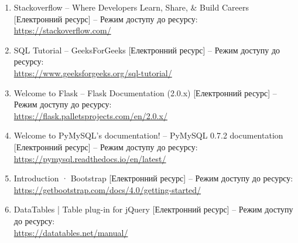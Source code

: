 \newpage

\bibsection
\begin{enumerate}
    \item Stackoverflow -- Where Developers Learn, Share, \& Build Careers [Електронний ресурс] --
    Режим доступу до ресурсу:\\ {\small \url{https://stackoverflow.com/}}
    \item SQL Tutorial -- GeeksForGeeks [Електронний ресурс] --
    Режим доступу до ресурсу:\\ {\small \url{https://www.geeksforgeeks.org/sql-tutorial/}}
    \item Welcome to Flask -- Flask Documentation (2.0.x) [Електронний ресурс] --
    Режим доступу до ресурсу:\\ {\small \url{https://flask.palletsprojects.com/en/2.0.x/}}
    \item Welcome to PyMySQL’s documentation! -- PyMySQL 0.7.2 documentation [Електронний ресурс] --
    Режим доступу до ресурсу:\\ {\small \url{https://pymysql.readthedocs.io/en/latest/}}
    \item Introduction · Bootstrap [Електронний ресурс] --
    Режим доступу до ресурсу:\\ {\small \url{https://getbootstrap.com/docs/4.0/getting-started/}}
    \item DataTables | Table plug-in for jQuery [Електронний ресурс] --
    Режим доступу до ресурсу:\\ {\small \url{https://datatables.net/manual/}}
\end{enumerate}